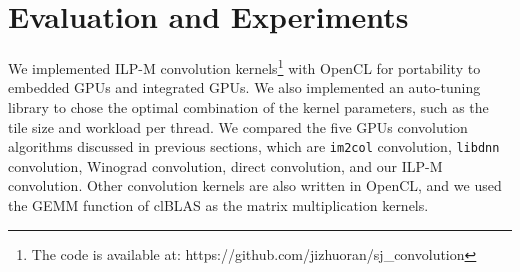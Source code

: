 \documentclass{article}
\begin{document}






\section{Evaluation and Experiments}

We implemented ILP-M convolution kernels\footnote{The code is available at: https://github.com/jizhuoran/sj\_convolution} with OpenCL for portability to embedded GPUs and integrated GPUs. We also implemented an auto-tuning library to chose the optimal combination of the kernel parameters, such as the tile size and workload per thread. We compared the five GPUs convolution algorithms discussed in previous sections, which are \texttt{im2col} convolution, \texttt{libdnn} convolution, Winograd convolution, direct convolution, and our ILP-M convolution. Other convolution kernels are also written in OpenCL, and we used the GEMM function of clBLAS as the matrix multiplication kernels.
\end{document}
